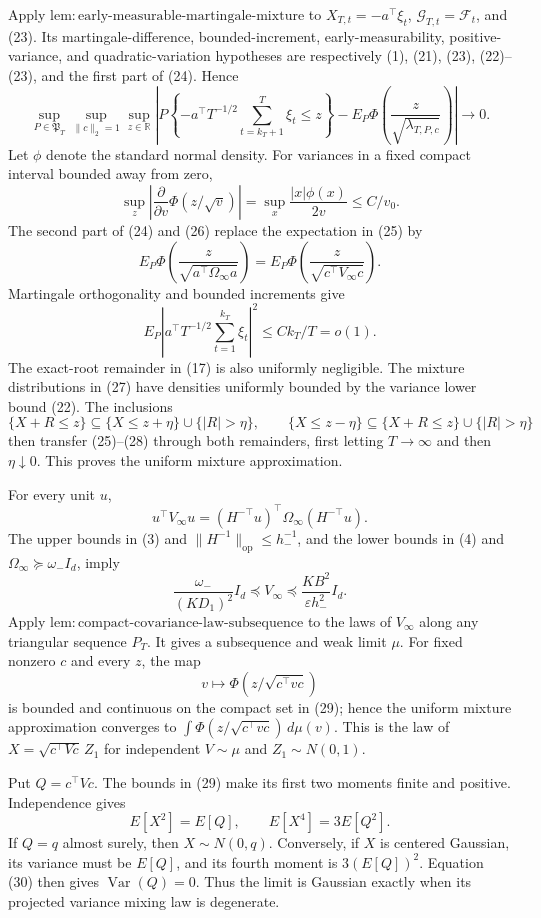 Apply \(\mathrm{lem:early\text{-}measurable\text{-}martingale\text{-}mixture}\) to \(X_{T,t}=-a^\top\xi_t\), \(\mathcal G_{T,t}=\mathcal F_t\), and (23). Its martingale-difference, bounded-increment, early-measurability, positive-variance, and quadratic-variation hypotheses are respectively (1), (21), (23), (22)--(23), and the first part of (24). Hence
\[
 \sup_{P\in\mathfrak P_T}\sup_{\|c\|_2=1}\sup_{z\in\mathbb R}
 \left|P\left\{-a^\top T^{-1/2}\sum_{t=k_T+1}^T\xi_t\le z\right\}
 -E_P\Phi\left(\frac z{\sqrt{\lambda_{T,P,c}}}\right)\right|\to0. \tag{25}
\]
Let \(\phi\) denote the standard normal density. For variances in a fixed compact interval bounded away from zero,
\[
 \sup_z\left|\frac{\partial}{\partial v}\Phi(z/\sqrt v)\right|
 =\sup_x\frac{|x|\phi(x)}{2v}\le C/v_0. \tag{26}
\]
The second part of (24) and (26) replace the expectation in (25) by
\[
 E_P\Phi\left(\frac z{\sqrt{a^\top\Omega_\infty a}}\right)
 =E_P\Phi\left(\frac z{\sqrt{c^\top V_\infty c}}\right). \tag{27}
\]
Martingale orthogonality and bounded increments give
\[
 E_P\left|a^\top T^{-1/2}\sum_{t=1}^{k_T}\xi_t\right|^2
 \le Ck_T/T=o(1). \tag{28}
\]
The exact-root remainder in (17) is also uniformly negligible. The mixture distributions in (27) have densities uniformly bounded by the variance lower bound (22). The inclusions
\[
 \{X+R\le z\}\subseteq\{X\le z+\eta\}\cup\{|R|>\eta\},
 \qquad
 \{X\le z-\eta\}\subseteq\{X+R\le z\}\cup\{|R|>\eta\}
\]
then transfer (25)--(28) through both remainders, first letting \(T\to\infty\) and then \(\eta\downarrow0\). This proves the uniform mixture approximation.

For every unit \(u\),
\[
 u^\top V_\infty u=(H^{-\top}u)^\top\Omega_\infty(H^{-\top}u).
\]
The upper bounds in (3) and \(\|H^{-1}\|_{\mathrm{op}}\le h_-^{-1}\), and the lower bounds in (4) and \(\Omega_\infty\succeq\omega_-I_d\), imply
\[
 \frac{\omega_-}{(KD_1)^2}I_d\preceq V_\infty
 \preceq\frac{KB^2}{\varepsilon h_-^2}I_d. \tag{29}
\]
Apply \(\mathrm{lem:compact\text{-}covariance\text{-}law\text{-}subsequence}\) to the laws of \(V_\infty\) along any triangular sequence \(P_T\). It gives a subsequence and weak limit \(\mu\). For fixed nonzero \(c\) and every \(z\), the map
\[
 v\longmapsto\Phi\left(z/\sqrt{c^\top vc}\right)
\]
is bounded and continuous on the compact set in (29); hence the uniform mixture approximation converges to \(\int\Phi(z/\sqrt{c^\top vc})\,d\mu(v)\). This is the law of \(X=\sqrt{c^\top Vc}\,Z_1\) for independent \(V\sim\mu\) and \(Z_1\sim N(0,1)\).

Put \(Q=c^\top Vc\). The bounds in (29) make its first two moments finite and positive. Independence gives
\[
 E[X^2]=E[Q],\qquad E[X^4]=3E[Q^2]. \tag{30}
\]
If \(Q=q\) almost surely, then \(X\sim N(0,q)\). Conversely, if \(X\) is centered Gaussian, its variance must be \(E[Q]\), and its fourth moment is \(3(E[Q])^2\). Equation (30) then gives \(\operatorname{Var}(Q)=0\). Thus the limit is Gaussian exactly when its projected variance mixing law is degenerate.

